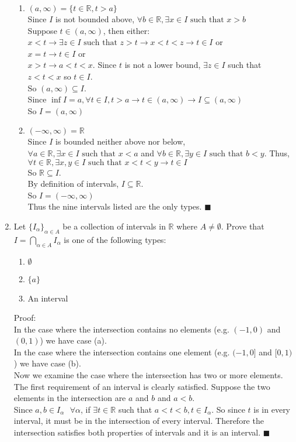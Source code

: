 \documentclass[12pt]{article}
\begin{document}
\begin{enumerate}
\begin{enumerate}
\item $(a,\infty) = \{t\in\mathbb{R}, t > a\}$\\
Since $I$ is not bounded above, $\forall b\in \mathbb{R}, \exists x\in I \text{ such that } x > b$\\
Suppose $t\in (a,\infty)$, then either:\\
$x < t \rightarrow \exists z\in I \text{ such that } z > t \rightarrow x<t<z \rightarrow t\in I$ or\\
$x = t \rightarrow t\in I$ or\\
$x > t \rightarrow a < t < x$.  Since $t$ is not a lower bound, $\exists z\in I$ such that $z<t<x$ so $t\in I$.\\
So $(a,\infty) \subseteq I$.\\
Since $\inf I = a, \forall t\in I, t > a \rightarrow t \in (a,\infty) \rightarrow I\subseteq (a,\infty)$\\
So $I = (a,\infty)$
\item $(-\infty,\infty) = \mathbb{R}$\\
Since $I$ is bounded neither above nor below, $\forall a \in \mathbb{R}, \exists x\in I \text{ such that } x < a$ and $\forall b \in \mathbb{R}, \exists y\in I \text{ such that } b < y$.
Thus, $\forall t\in \mathbb{R}, \exists x,y\in I \text{ such that } x<t<y \rightarrow t\in I$\\
So $\mathbb{R} \subseteq I$.\\
By definition of intervals, $I \subseteq \mathbb{R}$.\\
So $I = (-\infty,\infty)$\\
Thus the nine intervals listed are the only types.
$\blacksquare$
\end{enumerate}
\item Let $\{I_\alpha\}_{\alpha\in A}$ be a collection of intervals in $\mathbb{R}$ where $A\neq \emptyset$.  Prove that $I = \bigcap_{\alpha\in A} I_{\alpha}$ is one of the following types:
\begin{enumerate}
\item $\emptyset$
\item $\{a\}$
\item An interval
\end{enumerate}
Proof:\\
In the case where the intersection contains no elements (e.g. $(-1,0)$ and $(0,1)$) we have case (a).\\
In the case where the intersection contains one element (e.g. $(-1,0]$ and $[0,1)$) we have case (b).\\
Now we examine the case where the intersection has two or more elements.\\
The first requirement of an interval is clearly satisfied.  Suppose the two elements in the intersection are $a$ and $b$ and $a<b$.\\
Since $a,b\in I_\alpha \text{ }\forall \alpha$, if $\exists t\in\mathbb{R}$ such that $a<t<b, t\in I_\alpha$.  So since $t$ is in every interval, it must be in the intersection of every interval.  Therefore the intersection satisfies both properties of intervals and it is an interval. $\blacksquare$

\end{enumerate}
\end{document}
